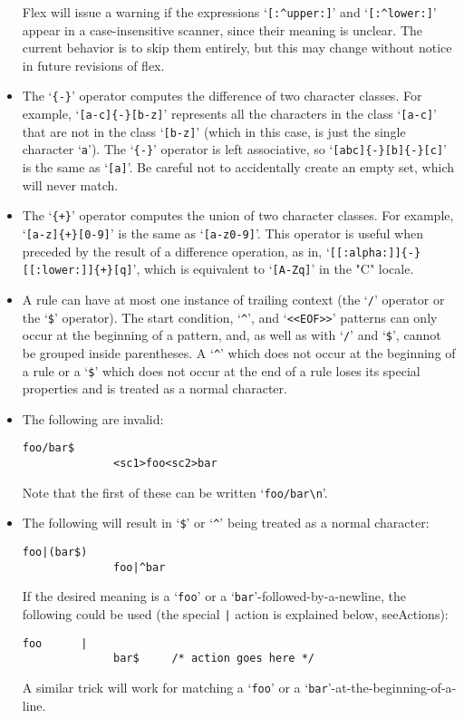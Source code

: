 \documentclass[openany,oneside]{book}
\begin{document}
\begin{itemize}
Flex will issue a warning if the expressions ‘\verb`[:^upper:]`’ and
‘\verb`[:^lower:]`’ appear in a case-insensitive scanner, since their meaning is
unclear. The current behavior is to skip them entirely, but this may change
without notice in future revisions of flex.
\item The ‘\verb`{-}`’ operator computes the difference of two character classes. For
example, ‘\verb`[a-c]{-}[b-z]`’ represents all the characters in the class
‘\verb`[a-c]`’ that are not in the class ‘\verb`[b-z]`’ (which in this case, is
just the single character ‘\verb`a`’). The ‘\verb`{-}`’ operator is left
associative, so ‘\verb`[abc]{-}[b]{-}[c]`’ is the same as ‘\verb`[a]`’. Be careful
not to accidentally create an empty set, which will never match.
\item The ‘\verb`{+}`’ operator computes the union of two character classes. For
example, ‘\verb`[a-z]{+}[0-9]`’ is the same as ‘\verb`[a-z0-9]`’. This operator
is useful when preceded by the result of a difference operation, as in,
‘\verb`[[:alpha:]]{-}[[:lower:]]{+}[q]`’, which is equivalent to
‘\verb`[A-Zq]`’ in the "C" locale.


\item A rule can have at most one instance of trailing context (the ‘\verb`/`’ operator
or the ‘\verb`$`’ operator).  The start condition, ‘\verb`^`’, and ‘\verb`<<EOF>>`’ patterns
can only occur at the beginning of a pattern, and, as well as with ‘\verb`/`’ and ‘\verb`$`’,
cannot be grouped inside parentheses.  A ‘\verb`^`’ which does not occur at
the beginning of a rule or a ‘\verb`$`’ which does not occur at the end of
a rule loses its special properties and is treated as a normal character.
\item The following are invalid:


\begin{verbatim}
foo/bar$
              <sc1>foo<sc2>bar
\end{verbatim}


Note that the first of these can be written ‘\verb`foo/bar\n`’.
\item The following will result in ‘\verb`$`’ or ‘\verb`^`’ being treated as a normal character:


\begin{verbatim}
foo|(bar$)
              foo|^bar
\end{verbatim}


If the desired meaning is a ‘\verb`foo`’ or a
‘\verb`bar`’-followed-by-a-newline, the following could be used (the
special \verb`|` action is explained below, seeActions):


\begin{verbatim}
foo      |
              bar$     /* action goes here */
\end{verbatim}


A similar trick will work for matching a ‘\verb`foo`’ or a
‘\verb`bar`’-at-the-beginning-of-a-line.
\end{itemize}
\end{document}
